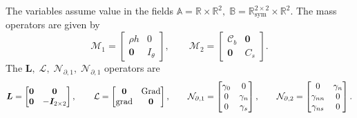 The variables assume value in the fields $\mathbb{A} = \mathbb{R} \times \mathbb{R}^2, \; \mathbb{B} =\mathbb{R}^{2\times 2}_{\text{sym}} \times \mathbb{R}^2$. The mass operators are given by 
\begin{equation}
\mathcal{M}_1 = \begin{bmatrix}
\rho h & 0 \\
\bm{0} & I_\theta
\end{bmatrix}, \qquad 
\mathcal{M}_2 = \begin{bmatrix}
\bm{\mathcal{C}}_b & \bm{0} \\
\bm{0} & C_s
\end{bmatrix}.
\end{equation} 
The $\bm{L}, \; \mathcal{L}, \; \mathcal{N}_{\partial, 1}, \; \mathcal{N}_{\partial, 1}$ operators are 
\begin{equation}
\bm{L} = \begin{bmatrix}
\bm{0}  & \bm{0}  \\
\bm{0} & -\bm{I}_{2 \times 2} \\
\end{bmatrix}, \qquad
\mathcal{L} = \begin{bmatrix}
\bm{0} & \operatorname*{Grad}\\
\operatorname*{grad} & \bm{0}\\
\end{bmatrix}, \qquad
\mathcal{N}_{\partial, 1} = \begin{bmatrix}
\gamma_0 & 0 \\ 
0 & \gamma_n \\
0 & \gamma_s \\
\end{bmatrix}, \qquad 
\mathcal{N}_{\partial, 2} = \begin{bmatrix}
0 & \gamma_{n}  \\
\gamma_{nn} & 0 \\
\gamma_{ns} & 0\\
\end{bmatrix}.
\end{equation}


